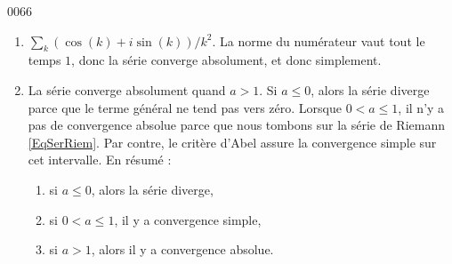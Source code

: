 \begin{corrige}{0066}
\begin{enumerate}
\item
$\sum_k(\cos(k)+i\sin(k))/k^2$.
La norme du numérateur vaut tout le temps $1$, donc la série converge absolument, et donc simplement.

\item
La série converge absolument quand $a>1$. Si $a\leq 0$, alors la série diverge parce que le terme général ne tend pas vers zéro. Lorsque $0<a\leq 1$, il n'y a pas de convergence absolue parce que nous tombons sur la série de Riemann \eqref{EqSerRiem}. Par contre, le critère d'Abel assure la convergence simple sur cet intervalle. En résumé :
\begin{enumerate}
\item si $a\leq 0$, alors la série diverge,
\item si $0<a\leq 1$, il y a convergence simple,
\item si $a>1$, alors il y a convergence absolue.
\end{enumerate}

\end{enumerate}


\end{corrige}
